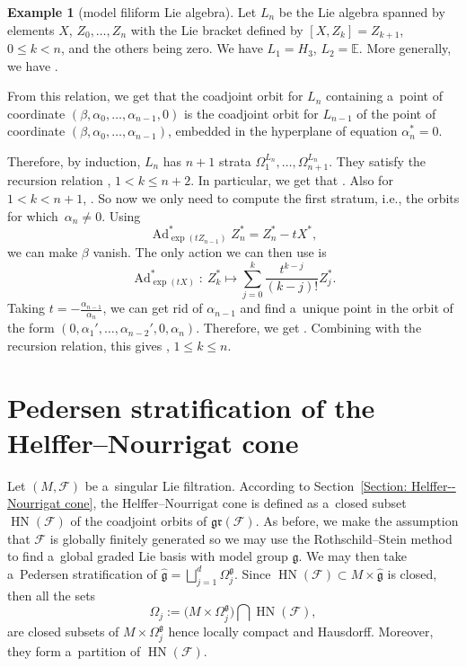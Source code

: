 \documentclass[pdftex]{sigma}
\newcommand{\R}{\mathbb R} %
\newcommand{\Ad}{\operatorname{Ad}} %
\newcommand{\g}{\mathfrak{g}} %
\newcommand{\HN}{\operatorname{HN}} %
\newcommand{\Fb}{\mathcal{F}} %
\newcommand{\gr}{\mathfrak{gr}} %
\numberwithin{equation}{section}
\theoremstyle{definition}
\newtheorem{ex}[thm]{Example}
\begin{document}
\begin{ex}[model filiform Lie algebra]\label{Ex: Filiform} Let $L_{n}$ be the Lie algebra spanned by elements $X$, $Z_0, \dots, Z_n$ with the Lie bracket defined by $[X,Z_k] = Z_{k+1}$, $0\leq k < n$, and the others being zero. We have $L_1 = H_3$, $L_2 = \mathbb{E}$. More generally, we have .

From this relation, we get that the coadjoint orbit for $L_{n}$ containing a~point of coordinate $(\beta,\alpha_0,\dots,\alpha_{n-1},0)$ is the coadjoint orbit for $L_{n-1}$ of the point of coordinate $(\beta,\alpha_0,\dots,\alpha_{n-1})$, embedded in the hyperplane of equation $\alpha_n^* = 0$.

Therefore, by induction, $L_{n}$ has $n+1$ strata $\Omega_1^{L_{n}},\dots,\Omega_{n+1}^{L_{n}}$. They satisfy the recursion relation , $1<k\leq n+2$. In particular, we get that \smash{$\Omega_{n+1}^{L_{n}} \cong \R^2$}. Also for $1<k<n+1$, . So now we only need to compute the first stratum, i.e., the orbits for which~${\alpha_n \neq 0}$.
Using
\[
\Ad^*_{\exp(tZ_{n-1})}Z_n^* = Z_n^*-tX^*,\]
 we can make $\beta$ vanish. The only action we can then use is
\[
\Ad^*_{\exp(tX)} \colon\ Z_k^* \mapsto \sum_{j = 0}^k \frac{t^{k-j}}{(k-j)!}Z_{j}^*.\]
Taking $t = -\frac{\alpha_{n-1}}{\alpha_n}$, we can get rid of $\alpha_{n-1}$ and find a~unique point in the orbit of the form
$(0,\alpha_1',\dots,\alpha_{n-2}',0,\alpha_{n})$. Therefore, we get \smash{$\Omega_1^{L_{n}} \cong \R^* \times \R^{n-1}$}.
Combining with the recursion relation, this gives \smash{$\Omega_k^{L_n} = \R^* \times \R^{n-k}$}, $1\leq k \leq n$.
\end{ex}

\section{Pedersen stratification of the Helffer--Nourrigat cone}\label{Section : Stratification HN Cone}

Let $(M,\Fb)$ be a~singular Lie filtration. According to Section~\ref{Section: Helffer--Nourrigat cone}, the Helffer--Nourrigat cone is defined as a~closed subset $\HN(\Fb)$ of the coadjoint orbits of $\gr(\Fb)$. As before, we make the assumption that $\Fb$ is globally finitely generated so we may use the Rothschild--Stein method to find a~global graded Lie basis with model group $\g$. We may then take a~Pedersen stratification of $\widehat{\g} = \bigsqcup_{j=1}^d\Omega_j^{\g}$. Since $\HN(\Fb) \subset M\times \widehat{\g}$ is closed, then all the sets
\[
\Omega_j := \bigl(M\times\Omega_j^{\g}\bigr)\bigcap \HN(\Fb),
\]
are closed subsets of $M \times \Omega_j^{\g}$ hence locally compact and Hausdorff. Moreover, they form a~partition of $\HN(\Fb)$.
\end{document}
